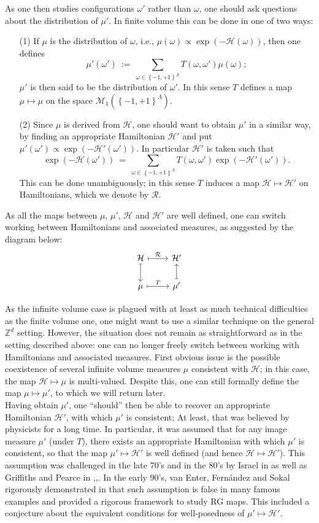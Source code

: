 \documentclass[12pt]{article}
\renewcommand{\H}{\mathcal{H}}
\newcommand{\M}{\mathcal{M}}
\newcommand{\RR}{\mathcal{R}}
\newcommand{\Z}{\mathbb{Z}}
\newcommand{\set}[1]{\left\{#1\right\}}
\newcommand{\1}{\mathbbm{1}}
\newcommand{\5}{\vspace{0.5cm}}
\theoremstyle{definition}
\begin{document}
As one then studies configurations $\omega'$ rather than $\omega$, one should ask questions about the distribution of $\mu'$. In finite volume this can be done in one of two ways:
\begin{itemize}
	\item[(1)] If $\mu$ is the distribution of $\omega$, i.e., $\mu(\omega)\propto\exp(-\H(\omega))$, then one defines
	$$\mu'(\omega') ~:=~ \sum_{\omega\in\set{-1,+1}^\Lambda}T(\omega,\omega')\mu(\omega);$$
	$\mu'$ is then said to be the distribution of $\omega'$. In this sense $T$ defines a map $\mu\mapsto\mu$ on the space $\M_1(\set{-1,+1}^\Lambda)$.
	\item[(2)] Since $\mu$ is derived from $\H$, one should want to obtain $\mu'$ in a similar way, by finding an appropriate Hamiltonian $\H'$ and put $\mu'(\omega')\propto\exp(-\H'(\omega'))$. In particular $\H'$ is taken such that
	$$\exp(-\H(\omega')) ~=~ \sum_{\omega\in\set{-1,+1}^{\Lambda}}T(\omega,\omega')\exp(-\H'(\omega')).$$
	This can be done unambiguously; in this sense $T$ induces a map $\H\mapsto\H'$ on Hamiltonians, which we denote by $\RR$.
\end{itemize}

As all the maps between $\mu$, $\mu'$, $\H$ and $\H'$ are well defined, one can switch working between Hamiltonians and associated measures, as suggested by the diagram below:
$$
\begin{tikzcd}
    \H \arrow[r, mapsto, "\RR"] \arrow[d, mapsto] & \H' \\
    \mu \arrow[r, mapsto, "T"] & \mu' \arrow[u, mapsto]
\end{tikzcd}
$$

As the infinite volume case is plagued with at least as much technical difficulties as the finite volume one, one might want to use a similar technique on the general $\Z^d$ setting. However, the situation does not remain as straightforward as in the setting described above: one can no longer freely switch between working with Hamiltonians and associated measures. First obvious issue is the possible coexistence of several infinite volume measures $\mu$ consistent with $\H$; in this case, the map $\H\mapsto\mu$ is multi-valued. Despite this, one can still formally define the map $\mu\mapsto\mu'$, to which we will return later. \\

Having obtain $\mu'$, one ``should'' then be able to recover an appropriate Hamiltonian $\H'$, with which $\mu'$ is consistent; At least, that was believed by physicists for a long time. In particular, it was assumed that for any image measure $\mu'$ (under $T$), there exists an appropriate Hamiltonian with which $\mu'$ is consistent, so that the map $\mu'\mapsto\H'$ is well defined (and hence $\H\mapsto\H'$). This assumption was challenged in the late 70's and in the 80's by Israel in \cite{Isr} as well as Griffiths and Pearce in \cite{GP1},\cite{GP2},\cite{Grif}. In the early 90's, van Enter, Fern\'andez and Sokal rigorously demonstrated in \cite{EFS} that such assumption is false in many famous examples and provided a rigorous framework to study RG maps. This included a conjecture about the equivalent conditions for well-posedness of $\mu'\mapsto\H'$. \\
\end{document}
